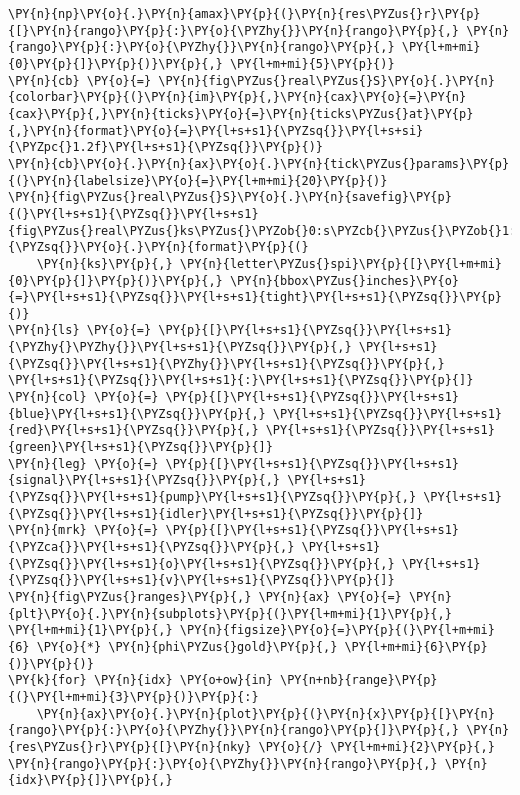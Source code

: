 \begin{Verbatim}[commandchars=\\\{\}]
    \PY{n}{np}\PY{o}{.}\PY{n}{amax}\PY{p}{(}\PY{n}{res\PYZus{}r}\PY{p}{[}\PY{n}{rango}\PY{p}{:}\PY{o}{\PYZhy{}}\PY{n}{rango}\PY{p}{,} \PY{n}{rango}\PY{p}{:}\PY{o}{\PYZhy{}}\PY{n}{rango}\PY{p}{,} \PY{l+m+mi}{0}\PY{p}{]}\PY{p}{)}\PY{p}{,} \PY{l+m+mi}{5}\PY{p}{)}
\PY{n}{cb} \PY{o}{=} \PY{n}{fig\PYZus{}real\PYZus{}S}\PY{o}{.}\PY{n}{colorbar}\PY{p}{(}\PY{n}{im}\PY{p}{,}\PY{n}{cax}\PY{o}{=}\PY{n}{cax}\PY{p}{,}\PY{n}{ticks}\PY{o}{=}\PY{n}{ticks\PYZus{}at}\PY{p}{,}\PY{n}{format}\PY{o}{=}\PY{l+s+s1}{\PYZsq{}}\PY{l+s+si}{\PYZpc{}1.2f}\PY{l+s+s1}{\PYZsq{}}\PY{p}{)}
\PY{n}{cb}\PY{o}{.}\PY{n}{ax}\PY{o}{.}\PY{n}{tick\PYZus{}params}\PY{p}{(}\PY{n}{labelsize}\PY{o}{=}\PY{l+m+mi}{20}\PY{p}{)}
\PY{n}{fig\PYZus{}real\PYZus{}S}\PY{o}{.}\PY{n}{savefig}\PY{p}{(}\PY{l+s+s1}{\PYZsq{}}\PY{l+s+s1}{fig\PYZus{}real\PYZus{}ks\PYZus{}\PYZob{}0:s\PYZcb{}\PYZus{}\PYZob{}1:s\PYZcb{}}\PY{l+s+s1}{\PYZsq{}}\PY{o}{.}\PY{n}{format}\PY{p}{(}
    \PY{n}{ks}\PY{p}{,} \PY{n}{letter\PYZus{}spi}\PY{p}{[}\PY{l+m+mi}{0}\PY{p}{]}\PY{p}{)}\PY{p}{,} \PY{n}{bbox\PYZus{}inches}\PY{o}{=}\PY{l+s+s1}{\PYZsq{}}\PY{l+s+s1}{tight}\PY{l+s+s1}{\PYZsq{}}\PY{p}{)}
\PY{n}{ls} \PY{o}{=} \PY{p}{[}\PY{l+s+s1}{\PYZsq{}}\PY{l+s+s1}{\PYZhy{}\PYZhy{}}\PY{l+s+s1}{\PYZsq{}}\PY{p}{,} \PY{l+s+s1}{\PYZsq{}}\PY{l+s+s1}{\PYZhy{}}\PY{l+s+s1}{\PYZsq{}}\PY{p}{,} \PY{l+s+s1}{\PYZsq{}}\PY{l+s+s1}{:}\PY{l+s+s1}{\PYZsq{}}\PY{p}{]}
\PY{n}{col} \PY{o}{=} \PY{p}{[}\PY{l+s+s1}{\PYZsq{}}\PY{l+s+s1}{blue}\PY{l+s+s1}{\PYZsq{}}\PY{p}{,} \PY{l+s+s1}{\PYZsq{}}\PY{l+s+s1}{red}\PY{l+s+s1}{\PYZsq{}}\PY{p}{,} \PY{l+s+s1}{\PYZsq{}}\PY{l+s+s1}{green}\PY{l+s+s1}{\PYZsq{}}\PY{p}{]}
\PY{n}{leg} \PY{o}{=} \PY{p}{[}\PY{l+s+s1}{\PYZsq{}}\PY{l+s+s1}{signal}\PY{l+s+s1}{\PYZsq{}}\PY{p}{,} \PY{l+s+s1}{\PYZsq{}}\PY{l+s+s1}{pump}\PY{l+s+s1}{\PYZsq{}}\PY{p}{,} \PY{l+s+s1}{\PYZsq{}}\PY{l+s+s1}{idler}\PY{l+s+s1}{\PYZsq{}}\PY{p}{]}
\PY{n}{mrk} \PY{o}{=} \PY{p}{[}\PY{l+s+s1}{\PYZsq{}}\PY{l+s+s1}{\PYZca{}}\PY{l+s+s1}{\PYZsq{}}\PY{p}{,} \PY{l+s+s1}{\PYZsq{}}\PY{l+s+s1}{o}\PY{l+s+s1}{\PYZsq{}}\PY{p}{,} \PY{l+s+s1}{\PYZsq{}}\PY{l+s+s1}{v}\PY{l+s+s1}{\PYZsq{}}\PY{p}{]}
\PY{n}{fig\PYZus{}ranges}\PY{p}{,} \PY{n}{ax} \PY{o}{=} \PY{n}{plt}\PY{o}{.}\PY{n}{subplots}\PY{p}{(}\PY{l+m+mi}{1}\PY{p}{,} \PY{l+m+mi}{1}\PY{p}{,} \PY{n}{figsize}\PY{o}{=}\PY{p}{(}\PY{l+m+mi}{6} \PY{o}{*} \PY{n}{phi\PYZus{}gold}\PY{p}{,} \PY{l+m+mi}{6}\PY{p}{)}\PY{p}{)}
\PY{k}{for} \PY{n}{idx} \PY{o+ow}{in} \PY{n+nb}{range}\PY{p}{(}\PY{l+m+mi}{3}\PY{p}{)}\PY{p}{:}
    \PY{n}{ax}\PY{o}{.}\PY{n}{plot}\PY{p}{(}\PY{n}{x}\PY{p}{[}\PY{n}{rango}\PY{p}{:}\PY{o}{\PYZhy{}}\PY{n}{rango}\PY{p}{]}\PY{p}{,} \PY{n}{res\PYZus{}r}\PY{p}{[}\PY{n}{nky} \PY{o}{/} \PY{l+m+mi}{2}\PY{p}{,} \PY{n}{rango}\PY{p}{:}\PY{o}{\PYZhy{}}\PY{n}{rango}\PY{p}{,} \PY{n}{idx}\PY{p}{]}\PY{p}{,}

\end{Verbatim}
